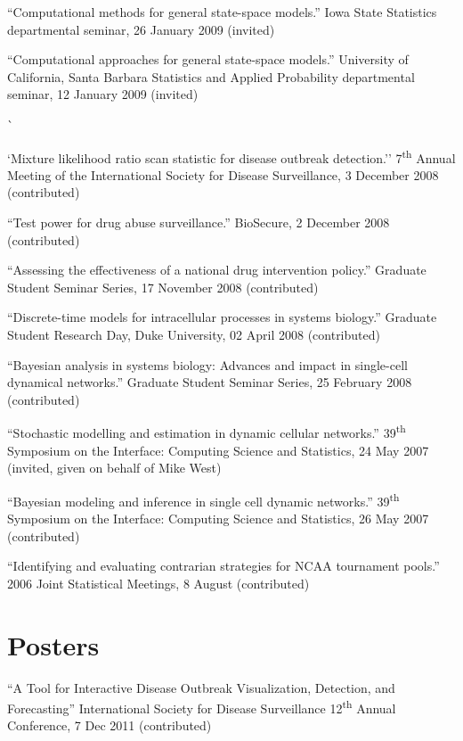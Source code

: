 \documentclass[overlapped,line]{res}
\begin{document}
\begin{resume}
{``Computational methods for general state-space models.'' Iowa State Statistics  departmental seminar, 26 January 2009 (invited)


``Computational approaches for general state-space models.'' University of California, Santa Barbara Statistics and Applied Probability departmental seminar, 12 January 2009 (invited)


\newpage\opening 

``Mixture likelihood ratio scan statistic for disease outbreak detection.'' 7\textsuperscript{th} Annual Meeting of the International Society for Disease Surveillance, 3 December 2008 (contributed)

``Test power for drug abuse surveillance.'' BioSecure, 2 December 2008 (contributed)

``Assessing the effectiveness of a national drug intervention policy.'' Graduate Student Seminar Series, 17 November 2008 (contributed)

``Discrete-time models for intracellular processes in systems biology.'' Graduate Student Research Day, Duke University, 02 April 2008 (contributed)

``Bayesian analysis in systems biology: Advances and impact in single-cell dynamical networks.'' Graduate Student Seminar Series, 25 February 2008 (contributed)

``Stochastic modelling and estimation in dynamic cellular networks.'' 39\textsuperscript{th} Symposium on the Interface: Computing Science and Statistics, 24 May 2007 (invited, given on behalf of Mike West)

``Bayesian modeling and inference in single cell dynamic networks.'' 39\textsuperscript{th} Symposium on the Interface: Computing Science and Statistics, 26 May 2007 (contributed)

``Identifying and evaluating contrarian strategies for NCAA tournament pools.'' 2006 Joint Statistical Meetings, 8 August (contributed)

}


\section{\bf Posters}

{\small

``A Tool for Interactive Disease Outbreak Visualization, Detection, and Forecasting'' International Society for Disease Surveillance 12\textsuperscript{th} Annual Conference, 7 Dec 2011 (contributed)

}
\end{resume}
\end{document}
